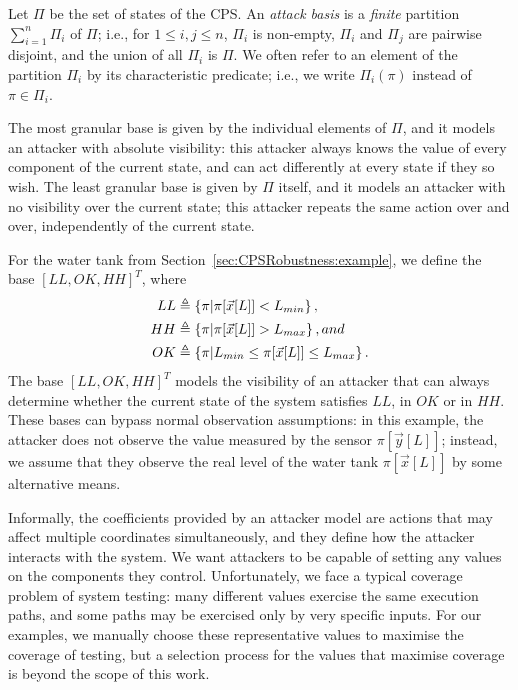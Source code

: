 \begin{definition}
  \label{def:CPSRobustness:AttackBasis}
Let $\Pi$ be the set of states of the CPS. An \emph{attack basis} is a \emph{finite} partition $\sum_{i=1}^n \Pi_i$ of $\Pi$; i.e., for $1\leq i,j \leq n$, $\Pi_i$ is non-empty, $\Pi_i$ and $\Pi_j$ are pairwise disjoint, and the union of all $\Pi_i$ is $\Pi$. We often refer to an element of the partition $\Pi_i$ by its characteristic predicate; i.e., we write $\Pi_i(\pi)$ instead of $\pi\in \Pi_i$.

The most granular base is given by the individual elements of $\Pi$, and it models an attacker with absolute visibility: this attacker always knows the value of every component of the current state, and can act differently at every state if they so wish. The least granular base is given by $\Pi$ itself, and it models an attacker with no visibility over the current state; this attacker repeats the same action over and over, independently of the current state.
\end{definition}
\begin{example}
  \label{ex:CPSRobustness:AttackBasis}
  For the water tank from Section~\ref{sec:CPSRobustness:example}, we define the base $[LL, OK, HH]^T$, where 
  \begin{align*}
    {LL}&\triangleq\left\{\pi| \pi[\vec{x}[L]]<L_{min}\right\},\\
    {HH}&\triangleq\left\{\pi| \pi[\vec{x}[L]]>L_{max}\right\}, and\\
    {OK}&\triangleq\left\{\pi|L_{min} \leq \pi[\vec{x}[L]]\leq L_{max}\right\}. 
  \end{align*} 
  The base $[LL, OK, HH]^T$ models the visibility of an attacker that can always determine whether the current state of the system satisfies $LL$, in $OK$ or in $HH$. These bases can bypass normal observation assumptions: in this example, the attacker does not observe the value measured by the sensor $\pi[\vec{y}[L]]$; instead, we assume that they observe the real level of the water tank $\pi[\vec{x}[L]]$ by some alternative means. %
\end{example}

Informally, the coefficients provided by an attacker model are actions that may affect multiple coordinates simultaneously, and they define how the attacker interacts with the system. We want attackers to be capable of setting any values on the components they control. Unfortunately, we face a typical coverage problem of system testing: many different values exercise the same execution paths, and some paths may be exercised only by very specific inputs. For our examples, we manually choose these representative values to maximise the coverage of testing, but a selection process for the values that maximise coverage is beyond the scope of this work.

